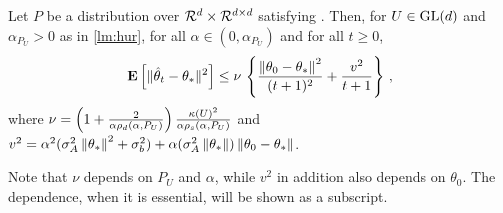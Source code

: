 \begin{theorem}\label{th:rate}
Let $P$ be a distribution over $\mathcal{R}^d\times \mathcal{R}^{d \times d}$ satisfying .
Then, for  $U\in\mathrm{GL}(d)$ and $\alpha_{P_U}>0$ as in \cref{lm:hur},
for all $\alpha\in (0,\alpha_{P_U})$ and for all $t\ge 0$,
\begin{align*}
\mathbf{E}\left[\| \hat{\theta}_t-\theta_*\|^2\right]
\leq
\nu\,
\left\{\frac{\left\| \theta_0-\theta_*\right\|^2}{(t+1)^2}+ \frac{v^2}{t+1} \right\}\,,
\end{align*}
where $\nu = \left(1+\tfrac2{\alpha\rho_d(\alpha,P_U)}\right)\tfrac{\kappa(U)^2}{\alpha \rho_s(\alpha,P_U)}$ and
$v^2 = 
\alpha^2(\sigma_A^2\left\| \theta_*\right\|^2+\sigma_b^2)+\alpha (\sigma_A^2\left\| \theta_*\right\|)\left\| \theta_0-\theta_*\right\|$.
\end{theorem}
Note that $\nu$ depends on $P_U$ and $\alpha$, while $v^2$ in addition also depends on $\theta_0$. The dependence,  when it is essential, will be shown as a subscript.
\begin{comment}

Consider the LSA with $b_t=0$, and $P^0$ has all the mass concentrated on $A_{P^0}=\begin{bmatrix} \lambda_{\min} &0\\ 0& \lambda_{\max}\end{bmatrix}$, for some $\lambda_{\max}>\lambda_{\min}>0$. Note that in this example $\ts=0$.
By choosing $\alpha<\frac2{\lambda_{\max}}$, in this case it is straightforward to write the expression for $\eh_t$ explicitly as below:
\begin{align*}
\eh_t&=\frac{1}{t+1}\sum_{s=0}^t e_t = \frac{1}{t+1}\sum_{s=0}^t (I-\alpha A_P)^{t-s} e_0\\
&=\frac{1}{t+1}(\alpha A)^{-1}\left(I-(I-\alpha A)^{t+1}\right)e_0
\end{align*}

\begin{align*}
\norm{\eh_t}^2&=\frac{1}{(t+1)^2}\norm{(\alpha A_P)^{-1}\left(I-(I-\alpha A_P)^{t+1}\right)e_0}^2
&\leq\frac{1}{(t+1)^2}\alpha^2\norm{A_P^{-1}}^2\norm{e_0}^2
\end{align*}

\begin{align*}
\norm{\eh_t}^2\geq \eh^2_t(1)=\frac{1}{(t+1)^2}(\alpha \lambda_{\min})^{-2}(1-\alpha \lambda_{\min}^t) \theta^2_0(1)
\end{align*}
Note that in this example, $\rhos{P^0}=\rhod{P^0}=\lambda_{\min} -\alpha \lambda_{\min}^2=\lambda_{\min}(1-\alpha \lambda_{\min})$. Sandwiching the error between the lower and upper bounds we have
\begin{align}
\frac{1}{(t+1)^2}(\alpha \lambda_{\min})^{-2}(1-\alpha \lambda_{\min}^t) \theta^2_0(1)\leq \norm{\eh_t}^2\leq
\frac{1}{(t+1)^2} \left(\alpha^{-1}\rhos{P^0}+\alpha^{-2}\rhos{P^0}^2\right)\norm{\theta_0}^2
\end{align}
\end{comment}

